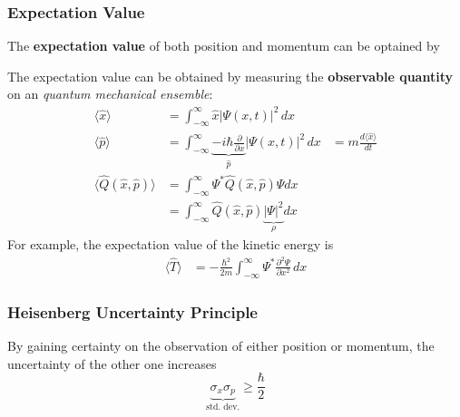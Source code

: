 \subsubsection{Expectation Value}
The \textbf{expectation value} of both position and momentum can be optained by

The expectation value can be obtained by measuring the \textbf{observable quantity} on an \textit{quantum mechanical ensemble}:
\begin{align*}
    \langle \hat{x} \rangle                 & = \int_{-\infty}^{\infty} \hat{x} |\Psi(x,t)|^2 \, dx                                                                                              \\
    \langle \hat{p} \rangle                 & = \int_{-\infty}^{\infty} \underbrace{-i\hbar \frac{\partial}{\partial x}}_{\hat{p}} |\Psi(x,t)|^2 \, dx & = m \frac{d\langle \hat{x} \rangle}{dt} \\
    \langle \hat{Q}(\hat{x},\hat{p})\rangle & = \int_{-\infty}^{\infty}\Psi^*\hat{Q}(\hat{x},\hat{p})\Psi dx                                                                                     \\
                                            & = \int_{-\infty}^{\infty}\hat{Q}(\hat{x},\hat{p}) \underbrace{|\Psi|^2}_{\rho} dx
\end{align*}
For example, the expectation value of the kinetic energy is
\begin{align*}
    \langle \hat{T} \rangle & = -\frac{\hbar^2}{2m}\int_{-\infty}^{\infty}\Psi^*\frac{\partial^2\Psi}{\partial x^2} \,dx
\end{align*}

\subsubsection{Heisenberg Uncertainty Principle}
By gaining certainty on the observation of either position or momentum, the uncertainty of the other one increases
\begin{equation*}
    \underbrace{\sigma_x\sigma_p}_{\text{std.\ dev.}} \geq \frac{\hbar}{2}
\end{equation*}
